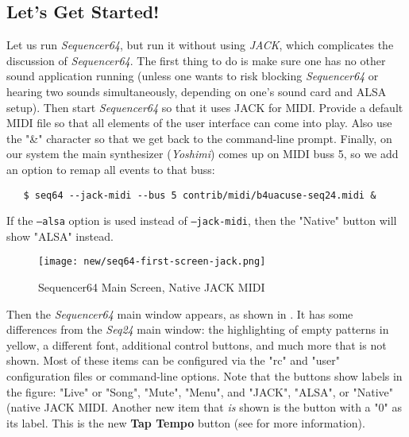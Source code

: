 \documentclass[
 11pt,
 twoside,
 a4paper,
 headinclude,
 footinclude,
 final                                 %
]{article}
\begin{document}
\subsection{Let's Get Started!}
\label{subsec:introduction_lets_get_started}

   Let us run \textsl{Sequencer64}, but run it without using \textsl{JACK},
   which complicates the discussion of \textsl{Sequencer64}.  The first
   thing to do is make sure one has no other sound application running
   (unless one wants to risk blocking \textsl{Sequencer64} or hearing two
   sounds simultaneously, depending on one's sound card and ALSA setup).
   Then start \textsl{Sequencer64} so that it uses JACK for MIDI.  Provide a
   default MIDI file so that all elements of the user interface can come
   into play.  Also use the "\&" character so that we get back to the
   command-line prompt.  Finally, on our system the main synthesizer
   (\textsl{Yoshimi}) comes up on MIDI buss 5, so we add an option to remap
   all events to that buss:


\begin{verbatim}
   $ seq64 --jack-midi --bus 5 contrib/midi/b4uacuse-seq24.midi &
\end{verbatim}

   If the \texttt{--alsa} option is used instead of
   \texttt{--jack-midi}, then the "Native" button will show "ALSA" instead.

\begin{figure}[H]
   \centering 
   \texttt{[image: new/seq64-first-screen-jack.png]}
   \caption{Sequencer64 Main Screen, Native JACK MIDI}
   \label{fig:seq64_main_screen}
\end{figure}

   Then the \textsl{Sequencer64} main window appears, as shown in
   .  It has some differences
   from the \textsl{Seq24} main window: the highlighting of
   empty patterns in yellow, a different font, additional control buttons,
   and much more that is not shown.
   Most of these items can be configured via the "rc" and "user" configuration
   files or command-line options.
   Note that the buttons show labels in the figure:
   "Live" or "Song", "Mute", "Menu", and "JACK", "ALSA", or "Native" (native
   JACK MIDI.
   Another new item that \textsl{is} shown is the button with a "0" as its label.
   This is the new \textbf{Tap Tempo} button (see
    for more information).
\end{document}
